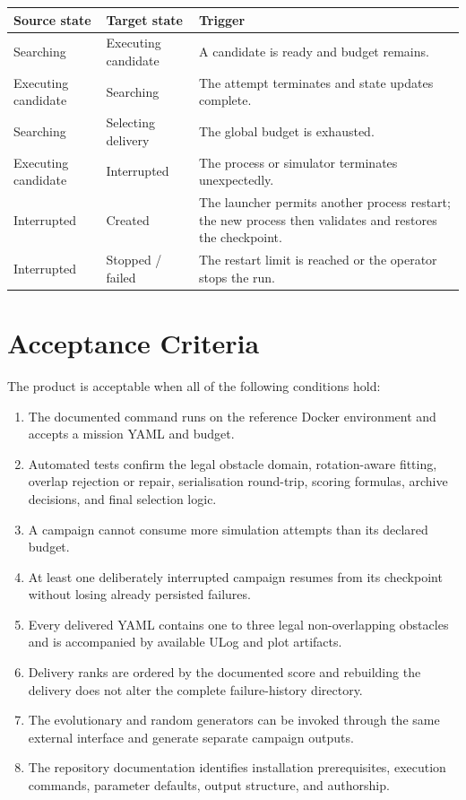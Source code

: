 \documentclass[11pt,a4paper,openany]{report}
\renewcommand{\arraystretch}{1.18}
\begin{document}
\begin{table}[H]
\centering
\begingroup
\small
\renewcommand{\arraystretch}{1.06}
\begin{tabularx}{\textwidth}{L{4.1cm} L{4.1cm} Y}
\toprule
\textbf{Source state} & \textbf{Target state} & \textbf{Trigger}\\
\midrule
Searching & Executing candidate & A candidate is ready and budget remains.\\
Executing candidate & Searching & The attempt terminates and state updates complete.\\
Searching & Selecting delivery & The global budget is exhausted.\\
Executing candidate & Interrupted & The process or simulator terminates unexpectedly.\\
Interrupted & Created & The launcher permits another process restart; the new process then validates and restores the checkpoint.\\
Interrupted & Stopped / failed & The restart limit is reached or the operator stops the run.\\
\bottomrule
\end{tabularx}
\endgroup
\end{table}

\section{Acceptance Criteria}
The product is acceptable when all of the following conditions hold:
\begingroup
\small
\begin{enumerate}[itemsep=1pt,topsep=3pt]
  \item The documented command runs on the reference Docker environment and accepts a mission YAML and budget.
  \item Automated tests confirm the legal obstacle domain, rotation-aware fitting, overlap rejection or repair, serialisation round-trip, scoring formulas, archive decisions, and final selection logic.
  \item A campaign cannot consume more simulation attempts than its declared budget.
  \item At least one deliberately interrupted campaign resumes from its checkpoint without losing already persisted failures.
  \item Every delivered YAML contains one to three legal non-overlapping obstacles and is accompanied by available ULog and plot artifacts.
  \item Delivery ranks are ordered by the documented score and rebuilding the delivery does not alter the complete failure-history directory.
  \item The evolutionary and random generators can be invoked through the same external interface and generate separate campaign outputs.
  \item The repository documentation identifies installation prerequisites, execution commands, parameter defaults, output structure, and authorship.
\end{enumerate}
\endgroup
\end{document}
